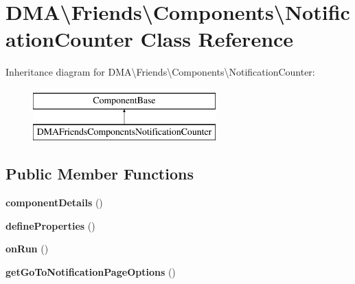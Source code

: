 \hypertarget{classDMA_1_1Friends_1_1Components_1_1NotificationCounter}{\section{D\-M\-A\textbackslash{}Friends\textbackslash{}Components\textbackslash{}Notification\-Counter Class Reference}
\label{classDMA_1_1Friends_1_1Components_1_1NotificationCounter}
}
Inheritance diagram for D\-M\-A\textbackslash{}Friends\textbackslash{}Components\textbackslash{}Notification\-Counter\-:\begin{figure}[H]
\begin{center}
\leavevmode
\includegraphics[height=2.000000cm]{d7/def/classDMA_1_1Friends_1_1Components_1_1NotificationCounter}
\end{center}
\end{figure}
\subsection*{Public Member Functions}
\begin{DoxyCompactItemize}
\item 
\hypertarget{classDMA_1_1Friends_1_1Components_1_1NotificationCounter_a670cc0b67254ca6330cb90e78d00ec50}{{\bfseries component\-Details} ()}\label{classDMA_1_1Friends_1_1Components_1_1NotificationCounter_a670cc0b67254ca6330cb90e78d00ec50}

\item 
\hypertarget{classDMA_1_1Friends_1_1Components_1_1NotificationCounter_acc9c8dda0d8fcb5d55f8b6bdcd93914e}{{\bfseries define\-Properties} ()}\label{classDMA_1_1Friends_1_1Components_1_1NotificationCounter_acc9c8dda0d8fcb5d55f8b6bdcd93914e}

\item 
\hypertarget{classDMA_1_1Friends_1_1Components_1_1NotificationCounter_a11868691e1796cd39a3821cf8fa752a0}{{\bfseries on\-Run} ()}\label{classDMA_1_1Friends_1_1Components_1_1NotificationCounter_a11868691e1796cd39a3821cf8fa752a0}

\item 
\hypertarget{classDMA_1_1Friends_1_1Components_1_1NotificationCounter_aa2ef7ee56cae987954e55457d8f790c4}{{\bfseries get\-Go\-To\-Notification\-Page\-Options} ()}\label{classDMA_1_1Friends_1_1Components_1_1NotificationCounter_aa2ef7ee56cae987954e55457d8f790c4}

\end{DoxyCompactItemize}
